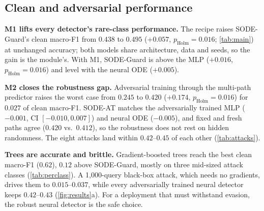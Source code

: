 \subsection{Clean and adversarial performance}
\textbf{M1 lifts every detector's rare-class performance.} The recipe raises
SODE-Guard's clean macro-F1 from $0.438$ to $0.495$ ($+0.057$,
$p_{\mathrm{Holm}}=0.016$; \cref{tab:main}) at unchanged accuracy; both models share
architecture, data and seeds, so the gain is the module's. With M1, SODE-Guard is above the MLP ($+0.016$,
$p_{\mathrm{Holm}}=0.016$) and level with the neural ODE ($+0.005$).

\textbf{M2 closes the robustness gap.} Adversarial training through the
multi-path predictor raises the worst case from $0.245$ to $0.420$ ($+0.174$,
$p_{\mathrm{Holm}}=0.016$) for $0.027$ of clean macro-F1. SODE-AT matches the
adversarially trained MLP ($-0.001$, CI $[-0.010,0.007]$) and neural ODE
($-0.005$), and fixed and fresh paths agree ($0.420$ vs.\ $0.412$), so the
robustness does not rest on hidden randomness. The eight attacks land within
$0.42$--$0.45$ of each other (\cref{tab:attacks}).

\textbf{Trees are accurate and brittle.} Gradient-boosted trees reach the best
clean macro-F1 ($0.62$), $0.12$ above SODE-Guard, mostly on three mid-sized
attack classes (\cref{tab:perclass}). A 1{,}000-query black-box attack, which
needs no gradients, drives them to $0.015$--$0.037$, while every adversarially
trained neural detector keeps $0.42$--$0.43$ (\cref{fig:results}a). For a
deployment that must withstand evasion, the robust neural detector is the safe
choice.

